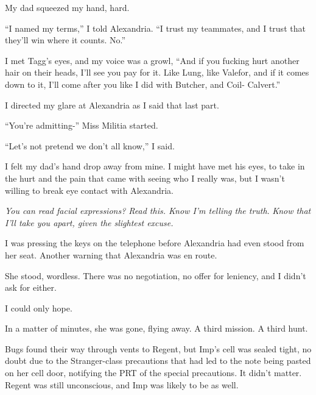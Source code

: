 My dad squeezed my hand, hard.



``I named my terms,'' I told Alexandria.  ``I trust my teammates, and I trust that they'll win where it counts.  No.''



I met Tagg's eyes, and my voice was a growl, ``And if you fucking hurt another hair on their heads, I'll see you pay for it.  Like Lung, like Valefor, and if it comes down to it, I'll come after you like I did with Butcher, and Coil- Calvert.''



I directed my glare at Alexandria as I said that last part.



``You're admitting-'' Miss Militia started.



``Let's not pretend we don't all know,'' I said.



I felt my dad's hand drop away from mine.  I might have met his eyes, to take in the hurt and the pain that came with seeing who I really was, but I wasn't willing to break eye contact with Alexandria.



\emph{You can read facial expressions?  Read this.  Know I'm telling the truth}.  \emph{Know that I'll take you apart, given the slightest excuse.}



I was pressing the keys on the telephone before Alexandria had even stood from her seat.  Another warning that Alexandria was en route.



She stood, wordless.  There was no negotiation, no offer for leniency, and I didn't ask for either.



I could only hope.



In a matter of minutes, she was gone, flying away.  A third mission.  A third hunt.



Bugs found their way through vents to Regent, but Imp's cell was sealed tight, no doubt due to the Stranger-class precautions that had led to the note being pasted on her cell door, notifying the PRT of the special precautions.  It didn't matter.  Regent was still unconscious, and Imp was likely to be as well.



